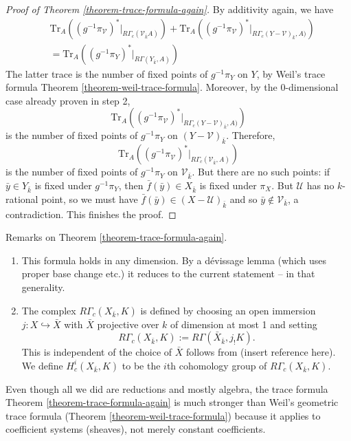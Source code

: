 \begin{proof}[Proof of Theorem \ref{theorem-trace-formula-again}]
\medskip\noindent
By additivity again, we have
\begin{eqnarray*}
& \text{Tr}_A((g^{-1}\pi_\mathcal{V})^* |_{R\Gamma_c(\mathcal{V}_{\bar k} A)})
+
\text{Tr}_A((g^{-1}\pi_\mathcal{V})^*
|_{R\Gamma_c(Y-\mathcal {V})_{\bar k}, A)}) \\
& =
\text{Tr}_A((g^{-1}\pi_Y)^* |_{R\Gamma(Y_{\bar k}, A)})
\end{eqnarray*}
The latter trace is the number of fixed points of $g^{-1}\pi_Y$ on $Y$, by
Weil's trace formula
Theorem \ref{theorem-weil-trace-formula}.
Moreover, by the 0-dimensional case already proven in step 2,
$$
\text{Tr}_A((g^{-1}\pi_\mathcal{V})^*|_{R\Gamma_c(Y-\mathcal{V})_{\bar k}, A)})
$$
is the number of fixed points of $g^{-1}\pi_Y$ on $(Y-\mathcal{V})_{\bar k}$.
Therefore,
$$
\text{Tr}_A((g^{-1}\pi_\mathcal{V})^* |_{R\Gamma_c(\mathcal{V}_{\bar k}, A)})
$$
is the number of fixed points of $g^{-1}\pi_Y$ on $\mathcal{V}_{\bar k}$. But
there are no such points: if $\bar y\in Y_{\bar k}$ is fixed under
$g^{-1}\pi_Y$, then $\bar f(\bar y) \in X_{\bar k}$ is fixed under $\pi_X$. But
$\mathcal{U}$ has no $k$-rational point, so we must have $\bar f(\bar y)\in
(X-\mathcal{U})_{\bar k}$ and so $\bar y\notin \mathcal{V}_{\bar k}$, a
contradiction.
This finishes the proof.
\end{proof}

\begin{remark}
\label{remark-on-trace-formula-again}
Remarks on Theorem \ref{theorem-trace-formula-again}.
\begin{enumerate}
\item
This formula holds in any dimension. By a d\'evissage lemma (which uses proper
base change etc.) it reduces to the current statement -- in that generality.
\item
The complex $R\Gamma_c(X_{\bar k}, K)$ is defined by choosing an open immersion
$j : X \hookrightarrow \bar X$ with $\bar X$ projective over $k$ of dimension at
most 1 and setting
$$
R\Gamma_c(X_{\bar k}, K) := R\Gamma(\bar X_{\bar k}, j_!K).
$$
This is independent of the choice of $\bar X$ follows from
(insert reference here). We define $H^i_c(X_{\bar k}, K)$
to be the $i$th cohomology group of $R\Gamma_c(X_{\bar k}, K)$.
\end{enumerate}
\end{remark}

\begin{remark}
\label{remark-stronger}
Even though all we did are reductions and mostly algebra, the trace formula
Theorem \ref{theorem-trace-formula-again} is much stronger than
Weil's geometric trace formula (Theorem \ref{theorem-weil-trace-formula})
because it applies to coefficient
systems (sheaves), not merely constant coefficients.
\end{remark}


